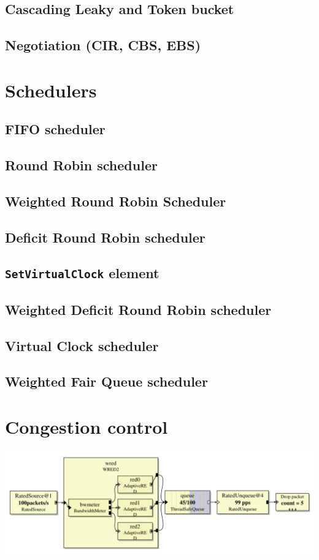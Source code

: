 \documentclass[a4paper]{article}
\begin{document}
  \subsection{Cascading Leaky and Token bucket}
  \subsection{Negotiation (CIR, CBS, EBS)}
  \section{Schedulers}
  \subsection{FIFO scheduler}
  \subsection{Round Robin scheduler}
  \subsection{Weighted Round Robin Scheduler}
  \subsection{Deficit Round Robin scheduler}
  \subsection{\texttt{SetVirtualClock} element}
  \subsection{Weighted Deficit Round Robin scheduler}
  \subsection{Virtual Clock scheduler}
  \subsection{Weighted Fair Queue scheduler}
  \section{Congestion control}
    \begin{center}
	  \includegraphics[scale=0.5]{wred2.pdf}
	  \label{fig:wred2}
    \end{center}
  
\end{document}

